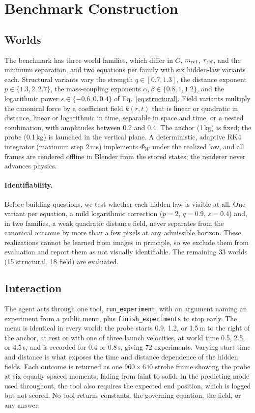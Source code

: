 \section{Benchmark Construction}
\label{sec:construction}

\subsection{Worlds}

The benchmark has three world families, which differ in $G$, $m_{\rm ref}$, $r_{\rm ref}$, and the minimum separation, and two equations per family with six hidden-law variants each. Structural variants vary the strength $q\in[0.7,1.3]$, the distance exponent $p\in\{1.3,2,2.7\}$, the mass-coupling exponents $\alpha,\beta\in\{0.8,1,1.2\}$, and the logarithmic power $s\in\{-0.6,0,0.4\}$ of Eq.~\eqref{eq:structural}. Field variants multiply the canonical force by a coefficient field $k(r,t)$ that is linear or quadratic in distance, linear or logarithmic in time, separable in space and time, or a nested combination, with amplitudes between 0.2 and 0.4. The anchor (1\,kg) is fixed; the probe (0.1\,kg) is launched in the vertical plane. A deterministic, adaptive RK4 integrator (maximum step 2\,ms) implements $\Phi_{\mathcal{W}}$ under the realized law, and all frames are rendered offline in Blender from the stored states; the renderer never advances physics.

\paragraph{Identifiability.} Before building questions, we test whether each hidden law is visible at all. One variant per equation, a mild logarithmic correction ($p=2$, $q=0.9$, $s=0.4$) and, in two families, a weak quadratic distance field, never separates from the canonical outcome by more than a few pixels at any admissible horizon. These realizations cannot be learned from images in principle, so we exclude them from evaluation and report them as not visually identifiable. The remaining 33 worlds (15 structural, 18 field) are evaluated.

\subsection{Interaction}
\label{sec:construction:tools}

The agent acts through one tool, \texttt{run\_experiment}, with an argument naming an experiment from a public menu, plus \texttt{finish\_experiments} to stop early. The menu is identical in every world: the probe starts 0.9, 1.2, or 1.5\,m to the right of the anchor, at rest or with one of three launch velocities, at world time 0.5, 2.5, or 4.5\,s, and is recorded for 0.4 or 0.8\,s, giving 72 experiments. Varying start time and distance is what exposes the time and distance dependence of the hidden fields. Each outcome is returned as one $960\times640$ strobe frame showing the probe at six equally spaced moments, fading from faint to solid. In the predicting mode used throughout, the tool also requires the expected end position, which is logged but not scored. No tool returns constants, the governing equation, the field, or any answer.


